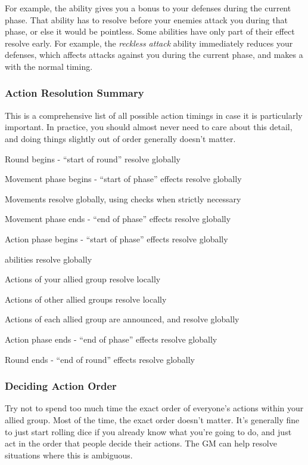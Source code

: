       For example, the  ability gives you a bonus to your defenses during the current phase.
      That ability has to resolve before your enemies attack you during that phase, or else it would be pointless.
      Some abilities have only part of their effect resolve early.
      For example, the \textit{reckless attack} ability immediately reduces your defenses, which affects attacks against you during the current phase, and makes a  with the normal timing.

    \subsubsection{Action Resolution Summary}
      This is a comprehensive list of all possible action timings in case it is particularly important.
      In practice, you should almost never need to care about this detail, and doing things slightly out of order generally doesn't matter.

      \begin{enumerate*}
        \item Round begins - ``start of round'' resolve globally
        \item Movement phase begins - ``start of phase'' effects resolve globally
        \item Movements resolve globally, using  checks when strictly necessary
        \item Movement phase ends - ``end of phase'' effects resolve globally
        \item Action phase begins - ``start of phase'' effects resolve globally
        \item {} abilities resolve globally
        \item Actions of your allied group resolve locally
        \item Actions of other allied groups resolve locally
        \item Actions of each allied group are announced, and resolve globally
        \item Action phase ends - ``end of phase'' effects resolve globally
        \item Round ends - ``end of round'' effects resolve globally
      \end{enumerate*}

    \subsubsection{Deciding Action Order}\label{Deciding Action Order}
      Try not to spend too much time the exact order of everyone's actions within your allied group.
      Most of the time, the exact order doesn't matter.
      It's generally fine to just start rolling dice if you already know what you're going to do, and just act in the order that people decide their actions.
      The GM can help resolve situations where this is ambiguous.

